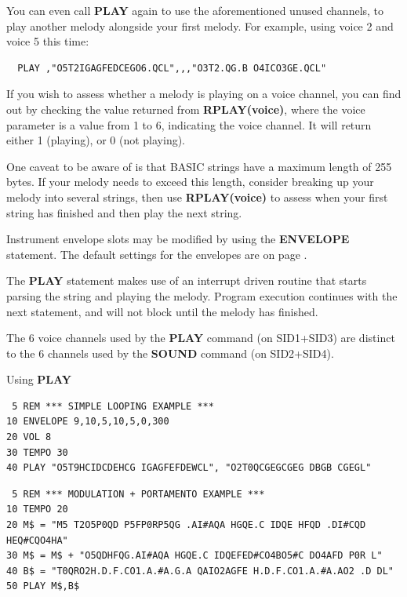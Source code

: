 \begin{description}[leftmargin=2cm,style=nextline]
  You can even call {\bf PLAY} again to use the aforementioned unused channels, to play another melody
  alongside your first melody. For example, using voice 2 and voice 5 this time:

\begin{tcolorbox}[colback=black,coltext=white]
\verbatimfont{\codefont}
\begin{verbatim}
  PLAY ,"O5T2IGAGFEDCEGO6.QCL",,,"O3T2.QG.B O4ICO3GE.QCL"
\end{verbatim}
\end{tcolorbox}

  If you wish to assess whether a melody is playing on a voice channel, you can
  find out by checking the value returned from {\bf RPLAY(voice)}, where the voice parameter
  is a value from 1 to 6, indicating the voice channel. It will return either 1 (playing),
  or 0 (not playing).

  One caveat to be aware of is that BASIC strings have a maximum length of 255 bytes.
  If your melody needs to exceed this length, consider breaking up your melody into several
  strings, then use {\bf RPLAY(voice)} to assess when your first string has finished and then
  play the next string.

  Instrument envelope slots may be modified by using the {\bf ENVELOPE}
  statement. The default settings for the envelopes are on
page \pageref{envelopetable}.

\item [Remarks:] The {\bf PLAY} statement makes use of an interrupt
                 driven routine that starts parsing the string
                 and playing the melody. Program execution continues
                 with the next statement, and will not block until
                 the melody has finished.

                 The 6 voice channels used by the {\bf PLAY} command
                 (on SID1+SID3) are distinct to the 6 channels used by
                 the {\bf SOUND} command (on SID2+SID4).


\item [Example:] Using {\bf PLAY}
\begin{tcolorbox}[colback=black,coltext=white]
\verbatimfont{\codefont}
\begin{verbatim}
 5 REM *** SIMPLE LOOPING EXAMPLE ***
10 ENVELOPE 9,10,5,10,5,0,300
20 VOL 8
30 TEMPO 30
40 PLAY "O5T9HCIDCDEHCG IGAGFEFDEWCL", "O2T0QCGEGCGEG DBGB CGEGL"
\end{verbatim}
\end{tcolorbox}

\begin{tcolorbox}[colback=black,coltext=white]
\verbatimfont{\codefont}
\begin{verbatim}
 5 REM *** MODULATION + PORTAMENTO EXAMPLE ***
10 TEMPO 20
20 M$ = "M5 T2O5P0QD P5FP0RP5QG .AI#AQA HGQE.C IDQE HFQD .DI#CQD HEQ#CQO4HA"
30 M$ = M$ + "O5QDHFQG.AI#AQA HGQE.C IDQEFED#CO4BO5#C DO4AFD P0R L"
40 B$ = "T0QRO2H.D.F.CO1.A.#A.G.A QAIO2AGFE H.D.F.CO1.A.#A.AO2 .D DL"
50 PLAY M$,B$
\end{verbatim}
\end{tcolorbox}
\end{description}

